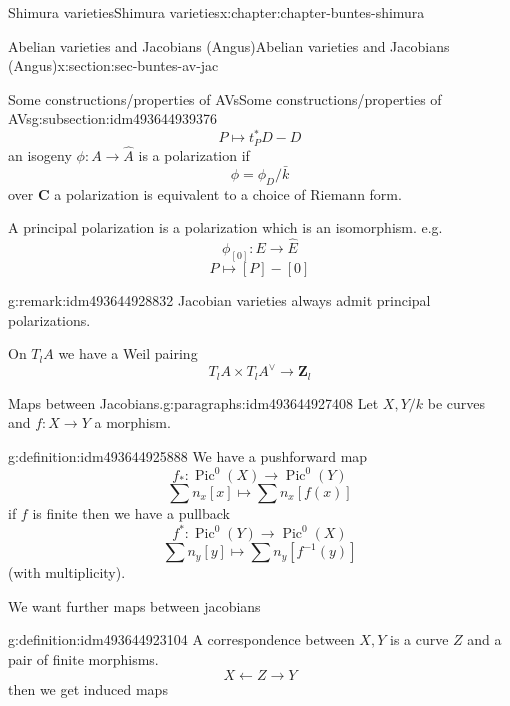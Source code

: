 \documentclass[oneside,10pt,]{book}
\numberwithin{equation}{section}
\newcommand{\inv}{^{-1}}
\newcommand{\ZZ}{\mathbf{Z}}
\newcommand{\CC}{\mathbf{C}}
\DeclareMathOperator{\Pic}{Pic}
\begin{document}
\begin{chapterptx}{Shimura varieties}{}{Shimura varieties}{}{}{x:chapter:chapter-buntes-shimura}
\begin{sectionptx}{Abelian varieties and Jacobians (Angus)}{}{Abelian varieties and Jacobians (Angus)}{}{}{x:section:sec-buntes-av-jac}
\begin{subsectionptx}{Some constructions\slash{}properties of AVs}{}{Some constructions\slash{}properties of AVs}{}{}{g:subsection:idm493644939376}
%
\begin{equation*}
P \mapsto t_P^* D -D
\end{equation*}
an isogeny \(\phi\colon A\to \hat A\) is a polarization if%
\begin{equation*}
\phi =  \phi_D /\bar k
\end{equation*}
over \(\CC\)  a polarization is equivalent to a choice of Riemann form.%
\par
A principal polarization is a polarization which is an isomorphism. e.g.%
\begin{equation*}
\phi_{[0]} \colon E \to \hat E
\end{equation*}
%
\begin{equation*}
P \mapsto [P] - [0]
\end{equation*}
%
\begin{remark}{}{g:remark:idm493644928832}%
Jacobian varieties always admit principal polarizations.%
\end{remark}
On \(T_lA \) we have  a Weil pairing%
\begin{equation*}
T_lA \times T_lA^\vee \to \ZZ_l
\end{equation*}
%
\begin{paragraphs}{Maps between Jacobians.}{g:paragraphs:idm493644927408}%
Let \(X,Y/k\) be curves and \(f\colon X \to Y\) a morphism.%
\begin{definition}{}{g:definition:idm493644925888}%
We have a pushforward map%
\begin{equation*}
f_*\colon \Pic^0(X) \to \Pic^0(Y)
\end{equation*}
%
\begin{equation*}
\sum n_x [x] \mapsto \sum n_x[f(x)]
\end{equation*}
if \(f\) is finite then we have  a pullback%
\begin{equation*}
f^* \colon \Pic^0(Y) \to \Pic^0(X)
\end{equation*}
%
\begin{equation*}
\sum n_y[y] \mapsto \sum n_y [f\inv (y)]
\end{equation*}
(with multiplicity).%
\end{definition}
We want further maps between jacobians%
\begin{definition}{}{g:definition:idm493644923104}%
A correspondence between \(X,Y\) is a curve \(Z\) and a pair of finite morphisms.%
\begin{equation*}
X \leftarrow Z \to Y
\end{equation*}
then we get induced maps%
\begin{equation*}

\end{equation*}
\end{definition}
\end{paragraphs}
\end{subsectionptx}
\end{sectionptx}
\end{chapterptx}
\end{document}
